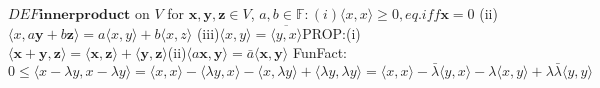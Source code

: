 \documentclass[8pt]{extarticle}
\theoremstyle{definition}
\begin{document}
{\fontsize{4.5}{5} \selectfont $DEF \mathbf{innerproduct}$ on $V$ for $\mathbf{x,y,z} \in V$, $a,b \in \mathbb{F}: (i) \langle x,x \rangle \geq 0, eq. iff \mathbf{x} =0 $
(ii) $\langle x,a \mathbf{y} + b \mathbf{z}  \rangle = a \langle x,y \rangle + b \langle x,z \rangle$
(iii)$ \langle x,y \rangle = \overline { \langle y,x \rangle }$PROP:(i)
$\langle \mathbf{x + y}, \mathbf{z} \rangle = \langle \mathbf{x}, \mathbf{z} \rangle + \langle \mathbf{y}, \mathbf{z} \rangle 
$(ii)$ \langle a\mathbf{x}, \mathbf{y} \rangle = \bar a \langle \mathbf{x}, \mathbf{y} \rangle $
FunFact: $0 \leq \langle x - \lambda y, x - \lambda y \rangle = \langle x,x\rangle - \langle \lambda y, x \rangle - \langle x, \lambda y \rangle + \langle \lambda y, \lambda y \rangle = \langle x,x \rangle - \bar \lambda \langle y,x\rangle - \lambda \langle x,y\rangle + \lambda \bar \lambda \langle y,y\rangle$

}
\end{document}
